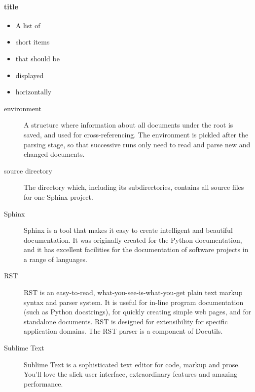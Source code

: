 \documentclass[letterpaper,10pt,english]{sphinxmanual}
\begin{document}
\paragraph{title}
\begin{itemize}\setlength{\itemsep}{0pt}\setlength{\parskip}{0pt}
\item {} 
A list of

\item {} 
short items

\item {} 
that should be

\item {} 
displayed

\item {} 
horizontally

\end{itemize}
\begin{description}
\item[{environment}] \leavevmode{}\label{\detokenize{usage/directives:term-environment}}
A structure where information about all documents under the root is
saved, and used for cross-referencing.  The environment is pickled
after the parsing stage, so that successive runs only need to read
and parse new and changed documents.

\item[{source directory}] \leavevmode{}\label{\detokenize{usage/directives:term-source-directory}}
The directory which, including its subdirectories, contains all
source files for one Sphinx project.

\item[{Sphinx}] \leavevmode{}\label{\detokenize{usage/directives:term-sphinx}}
Sphinx is a tool that makes it easy to create intelligent and beautiful documentation.
It was originally created for the Python documentation, and it has excellent facilities for the documentation of software projects in a range of languages.

\item[{RST}] \leavevmode{}\label{\detokenize{usage/directives:term-rst}}
RST is an easy-to-read, what-you-see-is-what-you-get plain text markup syntax and parser system.
It is useful for in-line program documentation (such as Python docstrings), for quickly creating simple web pages, and for standalone documents.
RST is designed for extensibility for specific application domains. The RST parser is a component of Docutils.

\item[{Sublime Text}] \leavevmode{}\label{\detokenize{usage/directives:term-sublime-text}}
Sublime Text is a sophisticated text editor for code, markup and prose. You'll love the slick user interface, extraordinary features and amazing performance.

\end{description}
\end{document}

